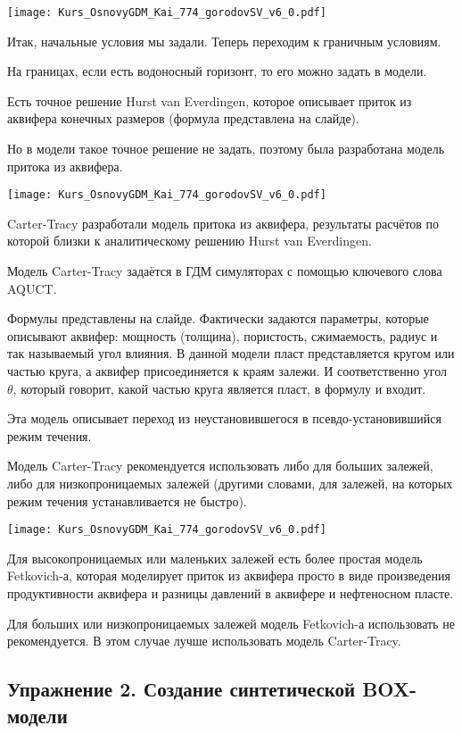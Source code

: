 \documentclass[main.tex]{subfiles}
\begin{document}
\texttt{[image: Kurs\_OsnovyGDM\_Kai\_774\_gorodovSV\_v6\_0.pdf]}

Итак, начальные условия мы задали. 
Теперь переходим к граничным условиям.

На границах, если есть водоносный горизонт, то его можно задать в модели.

Есть точное решение Hurst van Everdingen, которое описывает приток из аквифера конечных размеров (формула представлена на слайде).

Но в модели такое точное решение не задать, поэтому была разработана модель притока из аквифера.

\texttt{[image: Kurs\_OsnovyGDM\_Kai\_774\_gorodovSV\_v6\_0.pdf]}

Carter-Tracy разработали модель притока из аквифера, результаты расчётов по которой близки к аналитическому решению Hurst van Everdingen.

Модель Carter-Tracy задаётся в ГДМ симуляторах с помощью ключевого слова AQUCT.

Формулы представлены на слайде.
Фактически задаются параметры, которые описывают аквифер: мощность (толщина), пористость, сжимаемость, радиус и так называемый угол влияния.
В данной модели пласт представляется кругом или частью круга, а аквифер присоединяется к краям залежи.
И соответственно угол $\theta$, который говорит, какой частью круга является пласт, в формулу и входит.

Эта модель описывает переход из неустановившегося в псевдо-установившийся режим течения. 

Модель Carter-Tracy рекомендуется использовать либо для больших залежей, либо для низкопроницаемых залежей (другими словами, для залежей, на которых режим течения устанавливается не быстро).

\texttt{[image: Kurs\_OsnovyGDM\_Kai\_774\_gorodovSV\_v6\_0.pdf]}

Для высокопроницаемых или маленьких залежей есть более простая модель Fetkovich-а, которая моделирует приток из аквифера просто в виде произведения продуктивности аквифера и разницы давлений в аквифере и нефтеносном пласте.

Для больших или низкопроницаемых залежей модель Fetkovich-а использовать не рекомендуется. В этом случае лучше использовать модель Carter-Tracy.

\subsection{Упражнение 2. Создание синтетической BOX-модели}
\end{document}
